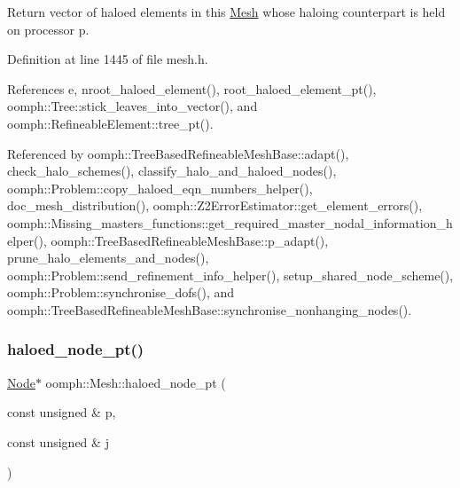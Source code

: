 Return vector of haloed elements in this \hyperlink{classoomph_1_1Mesh}{Mesh} whose haloing counterpart is held on processor p. 



Definition at line 1445 of file mesh.\+h.



References e, nroot\+\_\+haloed\+\_\+element(), root\+\_\+haloed\+\_\+element\+\_\+pt(), oomph\+::\+Tree\+::stick\+\_\+leaves\+\_\+into\+\_\+vector(), and oomph\+::\+Refineable\+Element\+::tree\+\_\+pt().



Referenced by oomph\+::\+Tree\+Based\+Refineable\+Mesh\+Base\+::adapt(), check\+\_\+halo\+\_\+schemes(), classify\+\_\+halo\+\_\+and\+\_\+haloed\+\_\+nodes(), oomph\+::\+Problem\+::copy\+\_\+haloed\+\_\+eqn\+\_\+numbers\+\_\+helper(), doc\+\_\+mesh\+\_\+distribution(), oomph\+::\+Z2\+Error\+Estimator\+::get\+\_\+element\+\_\+errors(), oomph\+::\+Missing\+\_\+masters\+\_\+functions\+::get\+\_\+required\+\_\+master\+\_\+nodal\+\_\+information\+\_\+helper(), oomph\+::\+Tree\+Based\+Refineable\+Mesh\+Base\+::p\+\_\+adapt(), prune\+\_\+halo\+\_\+elements\+\_\+and\+\_\+nodes(), oomph\+::\+Problem\+::send\+\_\+refinement\+\_\+info\+\_\+helper(), setup\+\_\+shared\+\_\+node\+\_\+scheme(), oomph\+::\+Problem\+::synchronise\+\_\+dofs(), and oomph\+::\+Tree\+Based\+Refineable\+Mesh\+Base\+::synchronise\+\_\+nonhanging\+\_\+nodes().

\mbox{\label{classoomph_1_1Mesh_a2d6d502736cb0c0ecd0c2aafd6a9d8b1}} 
\subsubsection{\texorpdfstring{haloed\+\_\+node\+\_\+pt()}{haloed\_node\_pt()}}
{\footnotesize\ttfamily \hyperlink{classoomph_1_1Node}{Node}$\ast$ oomph\+::\+Mesh\+::haloed\+\_\+node\+\_\+pt (\begin{DoxyParamCaption}\item[{const unsigned \&}]{p,  }\item[{const unsigned \&}]{j }\end{DoxyParamCaption})\hspace{0.3cm}{\ttfamily [inline]}}



